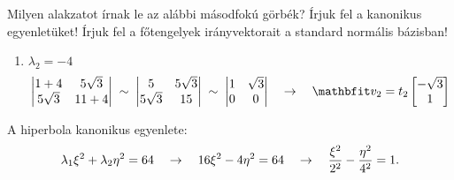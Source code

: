 \documentclass[exercise]{math-standalone}
\begin{document}
\begin{exercise}{%
    Milyen alakzatot írnak le az alábbi másodfokú görbék?
    Írjuk fel a kanonikus egyenletüket!
    Írjuk fel a főtengelyek irányvektorait a standard normális bázisban!
  }
{\begin{enumerate}[a)]
\begin{enumerate}[1)]
                    \[
                      \begin{vmatrix}
                        1 - 16     & 5 \sqrt{3} \\
                        5 \sqrt{3} & 11 - 16
                      \end{vmatrix} \;\sim\; \begin{vmatrix}
                        -15        & 5 \sqrt{3} \\
                        5 \sqrt{3} & -5
                      \end{vmatrix} \;\sim\; \begin{vmatrix}
                        -\sqrt{3} & 1 \\
                        0         & 0
                      \end{vmatrix}
                      \quad \rightarrow \quad
                      \rvec v_1 = t_1 \begin{bmatrix}
                        1 \\ \sqrt{3}
                      \end{bmatrix}
                    \]
              \item $\lambda_2 = -4$
                    \[
                      \begin{vmatrix}
                        1 + 4      & 5 \sqrt{3} \\
                        5 \sqrt{3} & 11 + 4
                      \end{vmatrix} \;\sim\; \begin{vmatrix}
                        5          & 5 \sqrt{3} \\
                        5 \sqrt{3} & 15
                      \end{vmatrix} \;\sim\; \begin{vmatrix}
                        1 & \sqrt{3} \\
                        0 & 0
                      \end{vmatrix}
                      \quad \rightarrow \quad
                      \rvec v_2 = t_2 \begin{bmatrix}
                        -\sqrt{3} \\ 1
                      \end{bmatrix}
                    \]
            \end{enumerate}

            A hiperbola kanonikus egyenlete:
            \[
              \lambda_1 \xi^2 + \lambda_2 \eta^2 = 64
              \quad \rightarrow \quad
              16 \xi^2 - 4 \eta^2 = 64
              \quad \rightarrow \quad
              \frac{\xi^2}{2^2} - \frac{\eta^2}{4^2} = 1
              \text.
            \]


\end{enumerate}}
\end{exercise}
\end{document}
